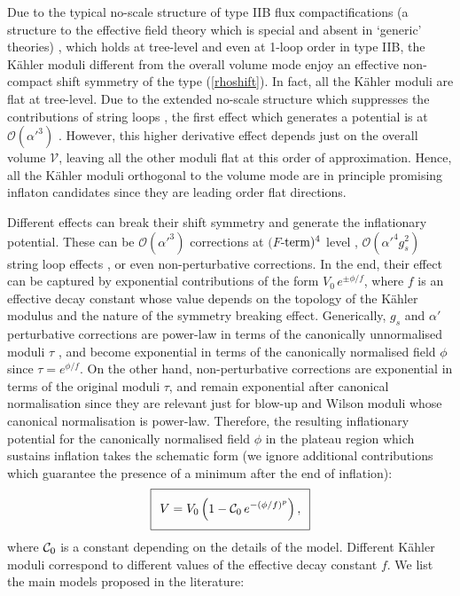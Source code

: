 Due to the typical no-scale structure of type IIB flux compactifications (a structure to the effective field theory which is special and absent in `generic' theories) \cite{Cremmer:1983bf,Burgess:2020qsc}, which holds at tree-level and even at 1-loop order in type IIB, the K\"ahler moduli different from the overall volume mode enjoy an effective non-compact shift symmetry of the type (\ref{rhoshift}). In fact, all the K\"ahler moduli are flat at tree-level. Due to the extended no-scale structure which suppresses the contributions of string loops \cite{Cicoli:2007xp}, the first effect which generates a potential is at $\mathcal{O}(\alpha'^3)$ \cite{Becker:2002nn}. However, this higher derivative effect depends just on the overall volume $\mathcal{V}$, leaving all the other moduli flat at this order of approximation. Hence, all the K\"ahler moduli orthogonal to the volume mode are in principle promising inflaton candidates since they are leading order flat directions. 

Different effects can break their shift symmetry and generate the inflationary potential. These can be $\mathcal{O}(\alpha'^3)$ corrections at $(F$-${\rm term})^4$ level \cite{Ciupke:2015msa}, $\mathcal{O}(\alpha'^4 g_s^2)$ string loop effects \cite{Berg:2005ja,vonGersdorff:2005bf,Berg:2007wt,Cicoli:2008va}, or even non-perturbative corrections. In the end, their effect can be captured by exponential contributions of the form $V_0\,e^{\pm \phi/f}$, where $f$ is an effective decay constant whose value depends on the topology of the K\"ahler modulus and the nature of the symmetry breaking effect. Generically, $g_s$ and $\alpha'$ perturbative corrections are power-law in terms of the canonically unnormalised moduli $\tau$ \cite{Cicoli:2021rub}, and become exponential in terms of the canonically normalised field $\phi$ since $\tau = e^{\phi/f}$. On the other hand, non-perturbative corrections are exponential in terms of the original moduli $\tau$, and remain exponential after canonical normalisation since they are relevant just for blow-up and Wilson moduli whose canonical normalisation is power-law. Therefore, the resulting inflationary potential for the canonically normalised field $\phi$ in the plateau region which sustains inflation takes the schematic form (we ignore additional contributions which guarantee the presence of a minimum after the end of inflation):
\begin{equation}
\setlength\fboxsep{0.25cm}
\setlength\fboxrule{0.4pt}
\boxed{
V = V_0 \left(1-{\cal C}_0\,e^{-(\phi/f)^p}\right),
}
\label{Refeq}
\end{equation}
where ${\cal C}_0$ is a constant depending on the details of the model. 
Different K\"ahler moduli correspond to different values of the effective decay constant $f$. We list the main models proposed in the literature:


